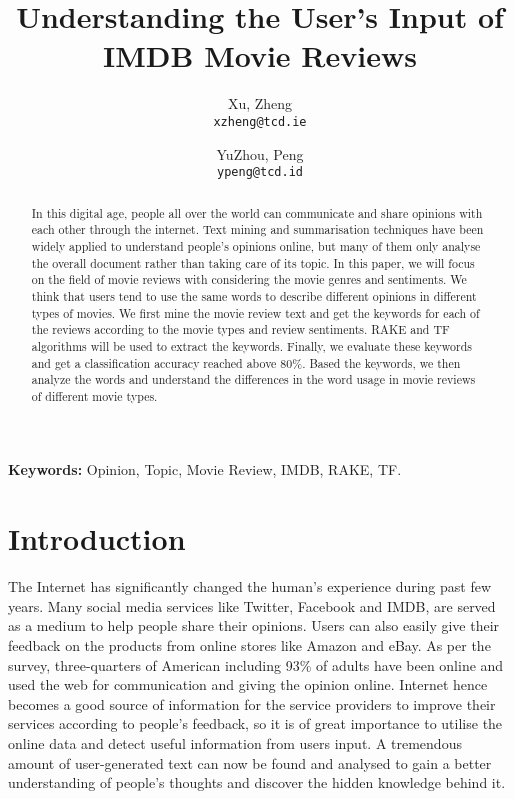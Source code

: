 \documentclass[a4paper,11pt]{article}
\title{Understanding the User’s Input of IMDB Movie Reviews}
\date{}
\author{
  Xu, Zheng\\
  \texttt{xzheng@tcd.ie}
  \and
  YuZhou, Peng\\
  \texttt{ypeng@tcd.id}
}
\begin{document}
\maketitle
\thispagestyle{empty}
\pagestyle{empty}
\begin{abstract}
In this digital age, people all over the world can communicate and share opinions with each other through the internet. Text mining and summarisation techniques have been widely applied to understand people's opinions online, but many of them only analyse the overall document rather than taking care of its topic. In this paper, we will focus on the field of movie reviews with considering the movie genres and sentiments. We think that users tend to use the same words to describe different opinions in different types of movies. We first mine the movie review text and get the keywords for each of the reviews according to the movie types and review sentiments. RAKE and TF algorithms will be used to extract the keywords. Finally, we evaluate these keywords and get a classification accuracy reached above 80\%. Based the keywords, we then analyze the words and understand the differences in the word usage in movie reviews of different movie types.
\end{abstract}

{\bf Keywords:} Opinion, Topic, Movie Review, IMDB, RAKE, TF.

\section{Introduction}
The Internet has significantly changed the human's experience during past few years. Many social media services like Twitter, Facebook and IMDB, are served as a medium to help people share their opinions. Users can also easily give their feedback on the products from online stores like Amazon and eBay. As per the survey, three-quarters of American including 93\% of adults have been online and used the web for communication and giving the opinion online. Internet hence becomes a good source of information for the service providers to improve their services according to people's feedback, so it is of great importance to utilise the online data and detect useful information from users input. A tremendous amount of user-generated text can now be found and analysed to gain a better understanding of people's thoughts and discover the hidden knowledge behind it.
\end{document}
